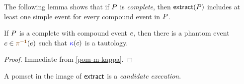 The following lemma shows that if $P$ is \emph{complete}, then
$\fextract{\aPS}$ includes at least one simple event for every compound event
in $P$.

\begin{lemma}
  \label{lem:compound:phantom:exists}
  If $P$ is a complete \PwTpo{} with compound event $e$,
  then
  there is a phantom event $\cEv\in\fmrginv{\aEv}$
  such that
  ${\color{blue}\kappa}(c)$ is a tautology.
  \begin{proof}
    Immediate from \ref{pom-m-kappa}.
  \end{proof}
\end{lemma}

A pomset in the image of $\fextract{}$ is a \emph{candidate execution}.

